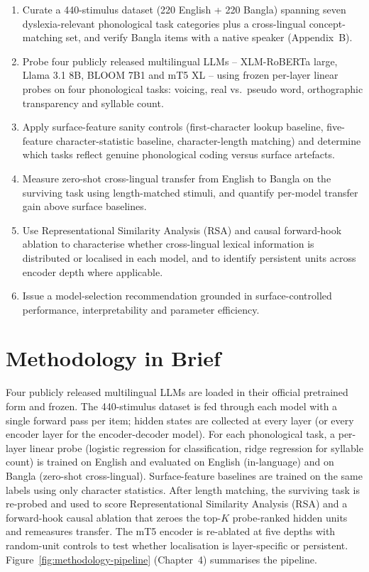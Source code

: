 \begin{enumerate}
    \item Curate a 440-stimulus dataset (220 English + 220 Bangla) spanning seven dyslexia-relevant phonological task categories plus a cross-lingual concept-matching set, and verify Bangla items with a native speaker (Appendix~B).
    \item Probe four publicly released multilingual LLMs -- XLM-RoBERTa large, Llama 3.1 8B, BLOOM 7B1 and mT5 XL -- using frozen per-layer linear probes on four phonological tasks: voicing, real vs.\ pseudo word, orthographic transparency and syllable count.
    \item Apply surface-feature sanity controls (first-character lookup baseline, five-feature character-statistic baseline, character-length matching) and determine which tasks reflect genuine phonological coding versus surface artefacts.
    \item Measure zero-shot cross-lingual transfer from English to Bangla on the surviving task using length-matched stimuli, and quantify per-model transfer gain above surface baselines.
    \item Use Representational Similarity Analysis (RSA) and causal forward-hook ablation to characterise whether cross-lingual lexical information is distributed or localised in each model, and to identify persistent units across encoder depth where applicable.
    \item Issue a model-selection recommendation grounded in surface-controlled performance, interpretability and parameter efficiency.
\end{enumerate}

\section{Methodology in Brief}

Four publicly released multilingual LLMs are loaded in their official pretrained form and frozen. The 440-stimulus dataset is fed through each model with a single forward pass per item; hidden states are collected at every layer (or every encoder layer for the encoder-decoder model). For each phonological task, a per-layer linear probe (logistic regression for classification, ridge regression for syllable count) is trained on English and evaluated on English (in-language) and on Bangla (zero-shot cross-lingual). Surface-feature baselines are trained on the same labels using only character statistics. After length matching, the surviving task is re-probed and used to score Representational Similarity Analysis (RSA) and a forward-hook causal ablation that zeroes the top-$K$ probe-ranked hidden units and remeasures transfer. The mT5 encoder is re-ablated at five depths with random-unit controls to test whether localisation is layer-specific or persistent. Figure~\ref{fig:methodology-pipeline} (Chapter~4) summarises the pipeline.

